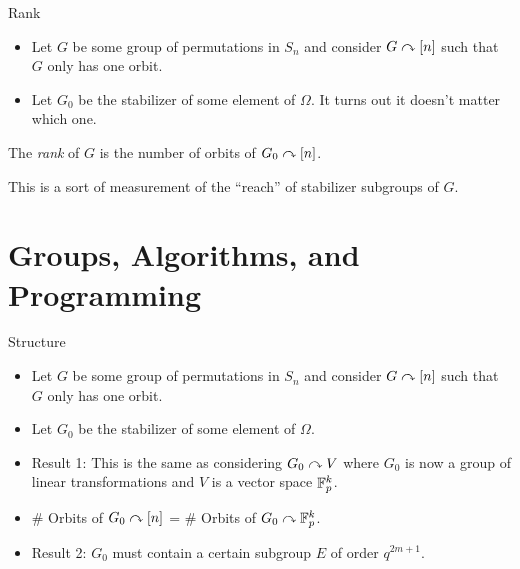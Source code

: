 \documentclass[aspectratio=169]{beamer}
\begin{document}
\begin{frame}{Rank}
    \begin{itemize}
        \item Let $G$ be some group of permutations in $S_n$ and consider $G \curvearrowright [n]$ such that $G$ only has one orbit.
        \item Let $G_0$ be the stabilizer of some element of $\Omega$. 
        It turns out it doesn't matter which one.
    \end{itemize} \pause

    \begin{defn}
        The \emph{rank} of $G$ is the number of orbits of $G_0 \curvearrowright [n]$.
    \end{defn}

    This is a sort of measurement of the ``reach'' of stabilizer subgroups of $G$.
\end{frame}

\section{Groups, Algorithms, and Programming}
\frame{\sectionpage}

\begin{frame}{Structure}
    \begin{itemize}
        \item Let $G$ be some group of permutations in $S_n$ and consider $G \curvearrowright [n]$ such that $G$ only has one orbit.
        \item Let $G_0$ be the stabilizer of some element of $\Omega$.  \pause
        \item \textcolor{sigma@mainblue}{Result 1:} This is the same as considering $G_0 \curvearrowright V$ where $G_0$ is now a group of linear transformations and $V$ is a vector space $\mathbb{F}_p^k$. 
        \item \# Orbits of $G_0 \curvearrowright [n]$ = \# Orbits of $G_0 \curvearrowright \mathbb{F}_p^k$. \pause 
        \item \textcolor{sigma@mainblue}{Result 2:} $G_0$ must contain a certain subgroup $E$ of order $q^{2m + 1}$.
    \end{itemize}
\end{frame}
\end{document}
